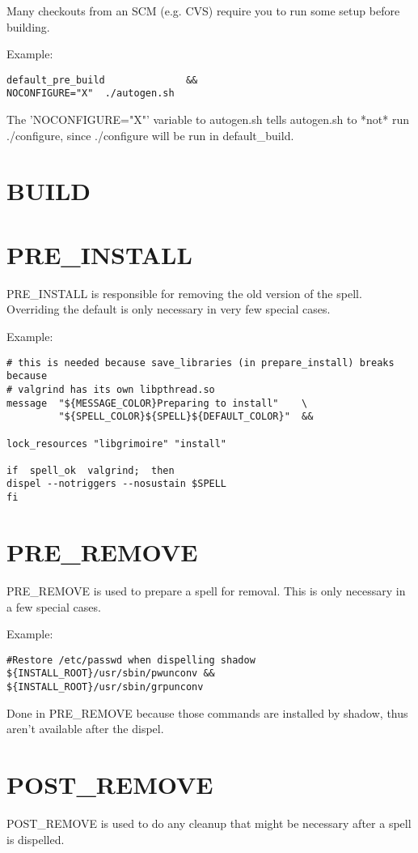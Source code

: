 \documentclass[a4paper,10pt]{book}
\begin{document}
Many checkouts from an SCM (e.g. CVS) require you to run some setup before
building.

Example:
\begin{verbatim}
default_pre_build              &&
NOCONFIGURE="X"  ./autogen.sh
\end{verbatim}

The 'NOCONFIGURE="X"' variable to autogen.sh tells autogen.sh to *not* run
./configure, since ./configure will be run in default\_build.

\section{BUILD}
\section{PRE\_INSTALL}
PRE\_INSTALL is responsible for removing the old version of the spell.
Overriding the default is only necessary in very few special cases.

Example:
\begin{verbatim}
# this is needed because save_libraries (in prepare_install) breaks because
# valgrind has its own libpthread.so
message  "${MESSAGE_COLOR}Preparing to install"    \
         "${SPELL_COLOR}${SPELL}${DEFAULT_COLOR}"  &&

lock_resources "libgrimoire" "install"

if  spell_ok  valgrind;  then
dispel --notriggers --nosustain $SPELL
fi
\end{verbatim}

\section{PRE\_REMOVE}
PRE\_REMOVE is used to prepare a spell for removal. This is only necessary in a
few special cases.

Example:
\begin{verbatim}
#Restore /etc/passwd when dispelling shadow
${INSTALL_ROOT}/usr/sbin/pwunconv &&
${INSTALL_ROOT}/usr/sbin/grpunconv
\end{verbatim}

Done in PRE\_REMOVE because those commands are installed by shadow, thus aren't
available after the dispel.

\section{POST\_REMOVE}
POST\_REMOVE is used to do any cleanup that might be necessary after a spell is
dispelled.
\end{document}
